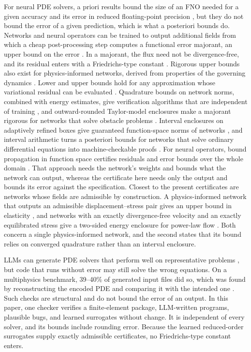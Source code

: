 \documentclass[11pt]{article}
\begin{document}
For neural PDE solvers, a priori results bound the size of an FNO needed for a given
accuracy \cite{kovachki2021} and its error in reduced floating-point precision
\cite{tu2024}, but they do not bound the error of a given prediction, which is what a
posteriori bounds do. Networks and neural operators can be trained to output additional fields
from which a cheap post-processing step computes a functional error majorant, an
upper bound on the error \cite{fanaskov2024,fanaskov2026}. In a majorant, the flux need
not be divergence-free, and its residual enters with a Friedrichs-type constant
\cite{repin2008}. Rigorous upper bounds also exist for physics-informed networks,
derived from properties of the governing dynamics \cite{hillebrecht2025}. Lower and
upper bounds hold for any approximation whose variational residual can be evaluated
\cite{ernst2025}. Quadrature bounds on network norms, combined with energy
estimates, give verification algorithms that are independent of training
\cite{haugen2025}, and outward-rounded Taylor-model enclosures make a majorant
rigorous for networks that solve obstacle problems \cite{damircheli2026}. Interval
enclosures on adaptively refined boxes give guaranteed function-space norms of
networks \cite{grundler2026}, and interval arithmetic turns a posteriori bounds for
networks that solve ordinary differential equations into machine-checkable proofs
\cite{tanaka2026}. For neural operators, bound propagation in function space
certifies residuals and error bounds over the whole domain \cite{hsiang2026}. That
approach needs the network's weights and bounds what the network can output, whereas
the certificate here needs only the output and bounds its error against the
specification. Closest to the present certificates are networks whose fields are
admissible by construction. A physics-informed network that outputs an admissible
displacement--stress pair gives an upper bound in elasticity \cite{guo2022}, and
networks with an exactly divergence-free velocity and an exactly equilibrated stress
give a two-sided energy enclosure for power-law flow \cite{bukhari2026}. Both concern
a single physics-informed network, and the second states that its bound relies on
converged quadrature rather than an interval enclosure.

LLMs can generate PDE solvers that perform well on representative problems
\cite{codepde2025}, but code that runs without error may still solve the wrong
equations. On a multiphysics benchmark, 39--40\% of generated input files did so,
which was found by reconstructing the encoded PDE and comparing it with the intended
one \cite{song2026}. Such checks are structural and do not bound the error
of an output. In this paper, one checker verifies a finite-element package,
LLM-written programs, plausible bugs, and learned surrogates without change. It is
independent of every solver, and its bounds include rounding error. Because the learned
reduced-order surrogates supply exactly admissible certificates, no Friedrichs-type
constant enters.
\end{document}
